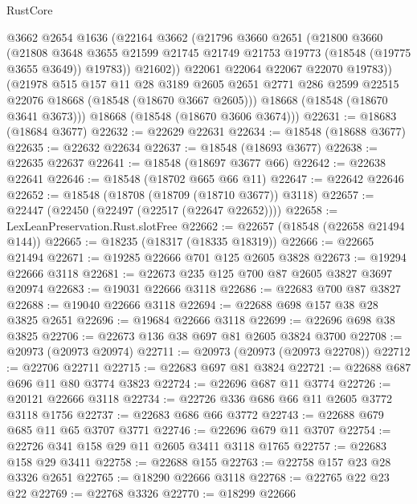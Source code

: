 \begin{lexlean}{RustCore}
\begin{coremodule}
            @3662
            @2654
            @1636
            (@22164
              @3662
              (@21796
                @3660
                @2651
                (@21800
                  @3660
                  (@21808
                    @3648
                    @3655
                    @21599
                    @21745
                    @21749
                    @21753
                    @19773
                    (@18548 (@19775 @3655 @3649))
                    @19783))
                @21602))
            @22061
            @22064
            @22067
            @22070
            @19783))
        (@21978
          @515
          @157
          @11
          @28
          @3189
          @2605
          @2651
          @2771
          @286
          @2599
          @22515
          @22076
          @18668
          (@18548 (@18670 @3667 @2605)))
        @18668
        (@18548 (@18670 @3641 @3673)))
      @18668
      (@18548 (@18670 @3606 @3674)))
@22631 := @18683 (@18684 @3677)
@22632 := @22629 @22631
@22634 := @18548 (@18688 @3677)
@22635 := @22632 @22634
@22637 := @18548 (@18693 @3677)
@22638 := @22635 @22637
@22641 := @18548 (@18697 @3677 @66)
@22642 := @22638 @22641
@22646 := @18548 (@18702 @665 @66 @11)
@22647 := @22642 @22646
@22652 := @18548 (@18708 (@18709 (@18710 @3677)) @3118)
@22657 := @22447 (@22450 (@22497 (@22517 (@22647 @22652))))
@22658 := LexLeanPreservation.Rust.slotFree
@22662 := @22657 (@18548 (@22658 @21494 @144))
@22665 := @18235 (@18317 (@18335 @18319))
@22666 := @22665 @21494
@22671 := @19285 @22666 @701 @125 @2605 @3828
@22673 := @19294 @22666 @3118
@22681 := @22673 @235 @125 @700 @87 @2605 @3827 @3697 @20974
@22683 := @19031 @22666 @3118
@22686 := @22683 @700 @87 @3827
@22688 := @19040 @22666 @3118
@22694 := @22688 @698 @157 @38 @28 @3825 @2651
@22696 := @19684 @22666 @3118
@22699 := @22696 @698 @38 @3825
@22706 := @22673 @136 @38 @697 @81 @2605 @3824 @3700
@22708 := @20973 (@20973 @20974)
@22711 := @20973 (@20973 (@20973 @22708))
@22712 := @22706 @22711
@22715 := @22683 @697 @81 @3824
@22721 := @22688 @687 @696 @11 @80 @3774 @3823
@22724 := @22696 @687 @11 @3774
@22726 := @20121 @22666 @3118
@22734 := @22726 @336 @686 @66 @11 @2605 @3772 @3118 @1756
@22737 := @22683 @686 @66 @3772
@22743 := @22688 @679 @685 @11 @65 @3707 @3771
@22746 := @22696 @679 @11 @3707
@22754 := @22726 @341 @158 @29 @11 @2605 @3411 @3118 @1765
@22757 := @22683 @158 @29 @3411
@22758 := @22688 @155
@22763 := @22758 @157 @23 @28 @3326 @2651
@22765 := @18290 @22666 @3118
@22768 := @22765 @22 @23 @22
@22769 := @22768 @3326
@22770 := @18299 @22666

\end{coremodule}
\end{lexlean}
